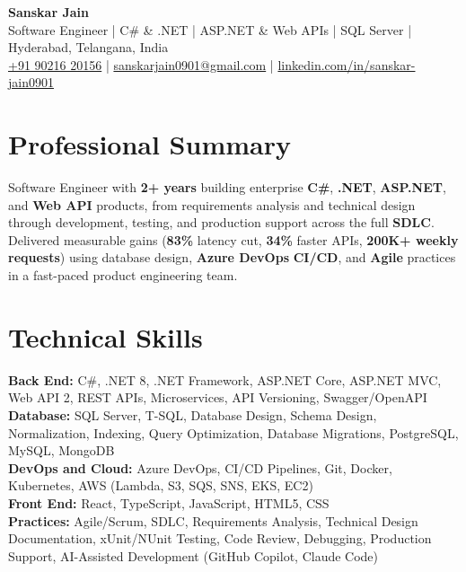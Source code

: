 \documentclass[a4paper,10pt]{article}
\begin{document}
\begin{center}
    {\LARGE \textbf{Sanskar Jain}} \\
    \vspace{2pt}
    Software Engineer \;|\; C\# \& .NET \;|\; ASP.NET \& Web APIs \;|\; SQL Server \;|\; Hyderabad, Telangana, India \\
    \vspace{2pt}
    \href{tel:+919021620156}{+91 90216 20156} \;|\;
    \href{mailto:sanskarjain0901@gmail.com}{sanskarjain0901@gmail.com} \;|\;
    \href{https://www.linkedin.com/in/sanskar-jain0901/}{linkedin.com/in/sanskar-jain0901}
\end{center}

\section*{Professional Summary}
Software Engineer with \textbf{2+ years} building enterprise \textbf{C\#}, \textbf{.NET}, \textbf{ASP.NET}, and \textbf{Web API} products, from requirements analysis and technical design through development, testing, and production support across the full \textbf{SDLC}.
Delivered measurable gains (\textbf{83\%} latency cut, \textbf{34\%} faster APIs, \textbf{200K+ weekly requests}) using database design, \textbf{Azure DevOps} \textbf{CI/CD}, and \textbf{Agile} practices in a fast-paced product engineering team.

\section*{Technical Skills}
\begin{sloppypar}
\noindent
\textbf{Back End:} C\#, .NET 8, .NET Framework, ASP.NET Core, ASP.NET MVC, Web API 2, REST APIs, Microservices, API Versioning, Swagger/OpenAPI \\
\textbf{Database:} SQL Server, T-SQL, Database Design, Schema Design, Normalization, Indexing, Query Optimization, Database Migrations, PostgreSQL, MySQL, MongoDB \\
\textbf{DevOps and Cloud:} Azure DevOps, CI/CD Pipelines, Git, Docker, Kubernetes, AWS (Lambda, S3, SQS, SNS, EKS, EC2) \\
\textbf{Front End:} React, TypeScript, JavaScript, HTML5, CSS \\
\textbf{Practices:} Agile/Scrum, SDLC, Requirements Analysis, Technical Design Documentation, xUnit/NUnit Testing, Code Review, Debugging, Production Support, AI-Assisted Development (GitHub Copilot, Claude Code)
\end{sloppypar}
\end{document}
